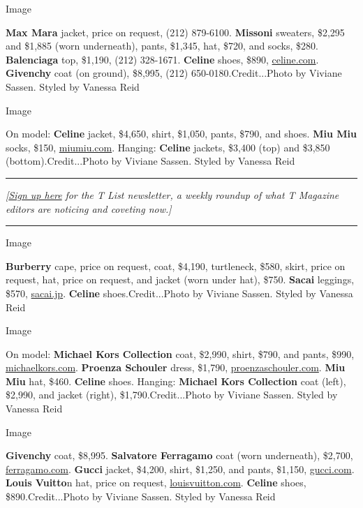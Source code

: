 Image

\textbf{Max Mara} jacket, price on request, (212) 879-6100.
\textbf{Missoni} sweaters, \$2,295 and \$1,885 (worn underneath), pants,
\$1,345, hat, \$720, and socks, \$280. \textbf{Balenciaga} top, \$1,190,
(212) 328-1671. \textbf{Celine} shoes, \$890,
\href{https://www.celine.com/en-us/home}{celine.com}. \textbf{Givenchy}
coat (on ground), \$8,995, (212) 650-0180.Credit...Photo by Viviane
Sassen. Styled by Vanessa Reid

Image

On model: \textbf{Celine} jacket, \$4,650, shirt, \$1,050, pants, \$790,
and shoes. \textbf{Miu Miu} socks, \$150,
\href{https://www.miumiu.com/us/en.html}{miumiu.com}. Hanging:
\textbf{Celine} jackets, \$3,400 (top) and \$3,850
(bottom).Credit...Photo by Viviane Sassen. Styled by Vanessa Reid

\begin{center}\rule{0.5\linewidth}{\linethickness}\end{center}

\emph{{[}}\href{https://www.nytimes3xbfgragh.onion/newsletters/t-list?module=inline}{\emph{Sign
up here}} \emph{for the T List newsletter, a weekly roundup of what T
Magazine editors are noticing and coveting now.{]}}

\begin{center}\rule{0.5\linewidth}{\linethickness}\end{center}

Image

\textbf{Burberry} cape, price on request, coat, \$4,190, turtleneck,
\$580, skirt, price on request, hat, price on request, and jacket (worn
under hat), \$750. \textbf{Sacai} leggings, \$570,
\href{http://www.sacai.jp/}{sacai.jp}. \textbf{Celine}
shoes.Credit...Photo by Viviane Sassen. Styled by Vanessa Reid

Image

On model: \textbf{Michael Kors Collection} coat, \$2,990, shirt, \$790,
and pants, \$990, \href{https://www.michaelkors.com/}{michaelkors.com}.
\textbf{Proenza Schouler} dress, \$1,790,
\href{https://www.proenzaschouler.com/}{proenzaschouler.com}.
\textbf{Miu Miu} hat, \$460. \textbf{Celine} shoes. Hanging:
\textbf{Michael Kors Collection} coat (left), \$2,990, and jacket
(right), \$1,790.Credit...Photo by Viviane Sassen. Styled by Vanessa
Reid

Image

\textbf{Givenchy} coat, \$8,995. \textbf{Salvatore Ferragamo} coat (worn
underneath), \$2,700,
\href{https://www.ferragamo.com/shop/us/en}{ferragamo.com}.
\textbf{Gucci} jacket, \$4,200, shirt, \$1,250, and pants, \$1,150,
\href{https://www.gucci.com/us/en/}{gucci.com}. \textbf{Louis Vuitto}n
hat, price on request,
\href{https://www.louisvuitton.com/}{louisvuitton.com}. \textbf{Celine}
shoes, \$890.Credit...Photo by Viviane Sassen. Styled by Vanessa Reid

